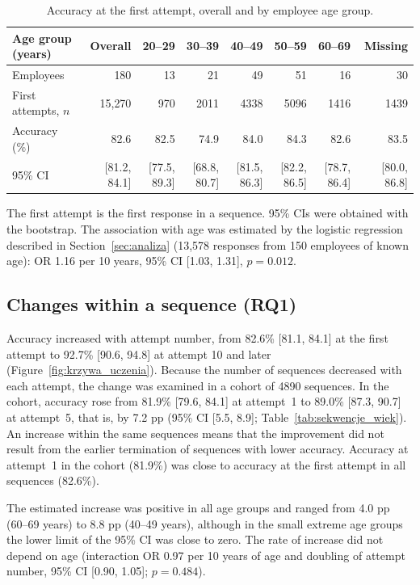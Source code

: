 \documentclass[11pt]{article}
\providecommand{\uwagatabeli}[1]{\par\vspace{2pt}\parbox{\linewidth}{\footnotesize #1}}
\newcommand{\AccAttOne}{82.6}
\newcommand{\AccAttOneCI}{[81.1, 84.1]}
\newcommand{\AccAttMax}{92.7}
\newcommand{\AccAttMaxCI}{[90.6, 94.8]}
\newcommand{\AttMax}{10}
\newcommand{\CohortK}{5}
\newcommand{\CohortN}{4890}
\newcommand{\CohortAccOne}{81.9}
\newcommand{\CohortAccK}{89.0}
\newcommand{\CohortAccOneCI}{[79.6, 84.1]}
\newcommand{\CohortAccKCI}{[87.3, 90.7]}
\newcommand{\FirstAcc}{82.6}
\newcommand{\FirstAgeOR}{1.16}
\newcommand{\FirstAgeORCI}{[1.03, 1.31]}
\newcommand{\FirstAgeP}{= 0.012}
\newcommand{\FirstAgeN}{13{,}578}
\newcommand{\FirstAgeEmp}{150}
\newcommand{\SeqChange}{7.2}
\newcommand{\SeqChangeCI}{[5.5, 8.9]}
\newcommand{\SeqChangeMinGroup}{60--69}
\newcommand{\SeqChangeMin}{4.0}
\newcommand{\SeqChangeMaxGroup}{40--49}
\newcommand{\SeqChangeMax}{8.8}
\newcommand{\SeqAgeOR}{0.97}
\newcommand{\SeqAgeORCI}{[0.90, 1.05]}
\newcommand{\SeqAgeP}{= 0.484}
\begin{document}
\begin{table}[H]
\centering
\caption{Accuracy at the first attempt, overall and by employee age group.}
\label{tab:pierwsza_proba_wiek}
\footnotesize
\setlength{\tabcolsep}{4pt}
\begin{tabular}{l*{7}{r}}
\toprule
Age group (years) & Overall & 20--29 & 30--39 & 40--49 & 50--59 & 60--69 & Missing \\
\midrule
Employees & 180 & 13 & 21 & 49 & 51 & 16 & 30 \\
First attempts, $n$ & 15{,}270 & 970 & 2011 & 4338 & 5096 & 1416 & 1439 \\
Accuracy (\%) & 82.6 & 82.5 & 74.9 & 84.0 & 84.3 & 82.6 & 83.5 \\
95\% CI & [81.2, 84.1] & [77.5, 89.3] & [68.8, 80.7] & [81.5, 86.3] & [82.2, 86.5] & [78.7, 86.4] & [80.0, 86.8] \\
\bottomrule
\end{tabular}%
\uwagatabeli{The first attempt is the first response in a sequence. 95\% CIs were obtained with the
bootstrap. The association with age was estimated by the logistic regression described in
Section~\ref{sec:analiza} (\FirstAgeN{} responses from \FirstAgeEmp{} employees of known age):
OR \FirstAgeOR{} per 10 years, 95\% CI \FirstAgeORCI, $p \FirstAgeP$.}
\end{table}

\subsection{Changes within a sequence (RQ1)}
Accuracy increased with attempt number, from \AccAttOne\% \AccAttOneCI{} at the first attempt to
\AccAttMax\% \AccAttMaxCI{} at attempt \AttMax{} and later (Figure~\ref{fig:krzywa_uczenia}). Because
the number of sequences decreased with each attempt, the change was examined in a cohort of
\CohortN{} sequences. In the cohort, accuracy rose from \CohortAccOne\% \CohortAccOneCI{} at
attempt~1 to \CohortAccK\% \CohortAccKCI{} at attempt~\CohortK{}, that is, by \SeqChange{} pp
(95\% CI \SeqChangeCI; Table~\ref{tab:sekwencje_wiek}). An increase within the same sequences means
that the improvement did not result from the earlier termination of sequences with lower accuracy.
Accuracy at attempt~1 in the cohort (\CohortAccOne\%) was close to accuracy at the first attempt in
all sequences (\FirstAcc\%).

The estimated increase was positive in all age groups and ranged from \SeqChangeMin{} pp
(\SeqChangeMinGroup{} years) to \SeqChangeMax{} pp (\SeqChangeMaxGroup{} years), although in the small
extreme age groups the lower limit of the 95\% CI was close to zero. The rate of increase did not
depend on age (interaction OR \SeqAgeOR{} per 10 years of age and doubling of attempt number, 95\% CI
\SeqAgeORCI; $p \SeqAgeP$).
\end{document}
